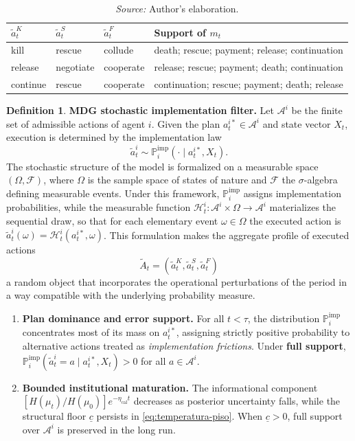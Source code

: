 \documentclass[12pt,a4paper]{article}
\theoremstyle{plain}
\theoremstyle{definition}
\newtheorem{definition}[theorem]{Definition}
\theoremstyle{remark}
\newcommand{\ProbI}[1]{\mathbb{P}_{#1}^{\mathrm{imp}}}
\newcommand{\1}{\mathbf{1}}
\begin{document}
\begin{table}[htbp]
\centering
\caption{Examples of the support of the physical outcome $m_t$ subject to execution of the triple $\tilde A_t$}
\label{tab:mano-dios-soporte-mt}
\begin{tabularx}{\linewidth}{@{}llll@{}}
\toprule
$\tilde a_t^K$ & $\tilde a_t^S$ & $\tilde a_t^F$ & \textbf{Support of $m_t$} \\
\midrule
kill & rescue & collude & death; rescue; payment; release; continuation \\
release & negotiate & cooperate & release; rescue; payment; death; continuation \\
continue & rescue & cooperate & continuation; rescue; payment; death; release \\
\bottomrule
\end{tabularx}
\caption*{\footnotesize\textit{Source:} Author's elaboration.}
\end{table}

\begin{definition}
\label{def:mano-dios-filtro}
\noindent\textbf{MDG stochastic implementation filter.} Let $\mathcal{A}^i$ be the
finite set of admissible actions of agent $i$. Given the plan
$a_t^{i\ast}\in\mathcal{A}^i$ and state vector $X_t$, execution is determined by the
implementation law
\[
\tilde a_t^i\sim\ProbI{i}(\cdot\mid a_t^{i\ast},X_t).
\]
The stochastic structure of the model is formalized on a measurable space
$(\Omega,\mathcal F)$, where $\Omega$ is the sample space of states of nature and
$\mathcal F$ the $\sigma$-algebra defining measurable events. Under this framework,
$\ProbI{i}$ assigns implementation probabilities, while the measurable function
$\mathcal H_t^i:\mathcal A^i\times\Omega\to\mathcal A^i$ materializes the sequential
draw, so that for each elementary event $\omega\in\Omega$ the executed action is
$\tilde a_t^i(\omega)=\mathcal H_t^i(a_t^{i\ast},\omega)$. This formulation makes the
aggregate profile of executed actions
\begin{equation}
\label{eq:tilde-A-t}
\tilde{A}_t=(\tilde a_t^K,\tilde a_t^S,\tilde a_t^F)
\end{equation}
a random object that incorporates the operational perturbations of the period in a way
compatible with the underlying probability measure.
\begin{enumerate}
  \item[\textup{(i)}] \textbf{Plan dominance and error support.} For all $t<\tau$, the
  distribution $\ProbI{i}$ concentrates most of its mass on $a_t^{i\ast}$, assigning
  strictly positive probability to alternative actions treated as \emph{implementation
  frictions}. Under \textbf{full support},
  $\ProbI{i}(\tilde a_t^i=a\mid a_t^{i\ast},X_t)>0$ for all $a\in\mathcal A^i$.
  \item[\textup{(ii)}] \textbf{Bounded institutional maturation.} The informational
  component $[H(\mu_t)/H(\mu_0)]e^{-\eta_{\mathrm{cal}}t}$ decreases as posterior
  uncertainty falls, while the structural floor $\underline c$ persists in
  \eqref{eq:temperatura-piso}. When $\underline c>0$, full support over
  $\mathcal A^i$ is preserved in the long run.
\end{enumerate}
\end{definition}
\end{document}
